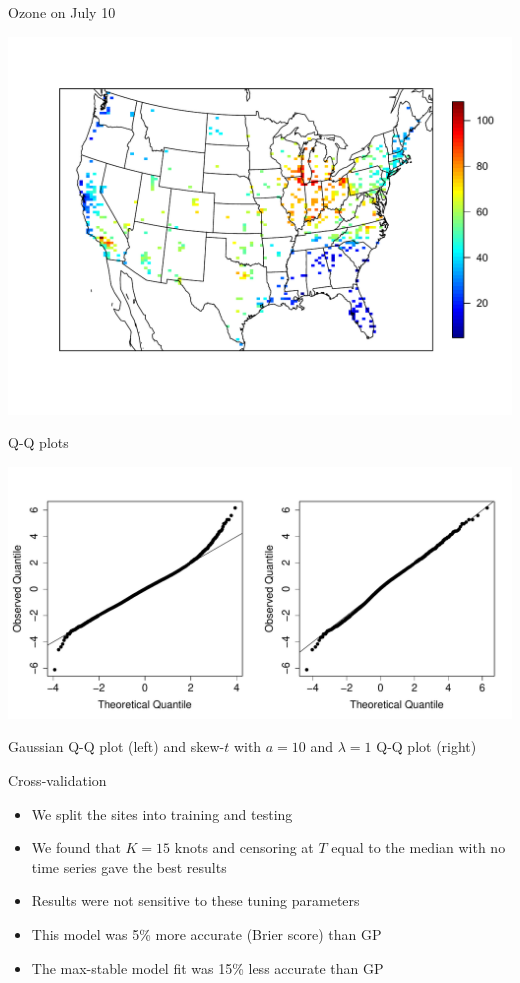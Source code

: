 \documentclass{beamer}
\begin{document}
 \begin{frame}{Ozone on July 10}
 	\begin{center}
 		\includegraphics[width=1.2\textheight]{ozone-10jul-us}
 	\end{center}
 \end{frame}

 \begin{frame}{Q-Q plots}
 	\begin{center}
 		\includegraphics[width=0.9\textheight]{qq-res}

 		Gaussian Q-Q plot (left) and skew-$t$ with $a = 10$ and $\lambda = 1$ Q-Q plot (right)
 	\end{center}
 \end{frame}

 \begin{frame}{Cross-validation}
 	\begin{itemize}\setlength\itemsep{1em}
 	\item We split the sites into training and testing
 	\item We found that $K=15$ knots and censoring at $T$ equal to the median with no time series gave the best results
 	\item Results were not sensitive to these tuning parameters
 	\item This model was 5\% more accurate (Brier score) than GP
 	\item The max-stable model fit was 15\% less accurate than GP
 	\end{itemize}
 \end{frame}
\end{document}
